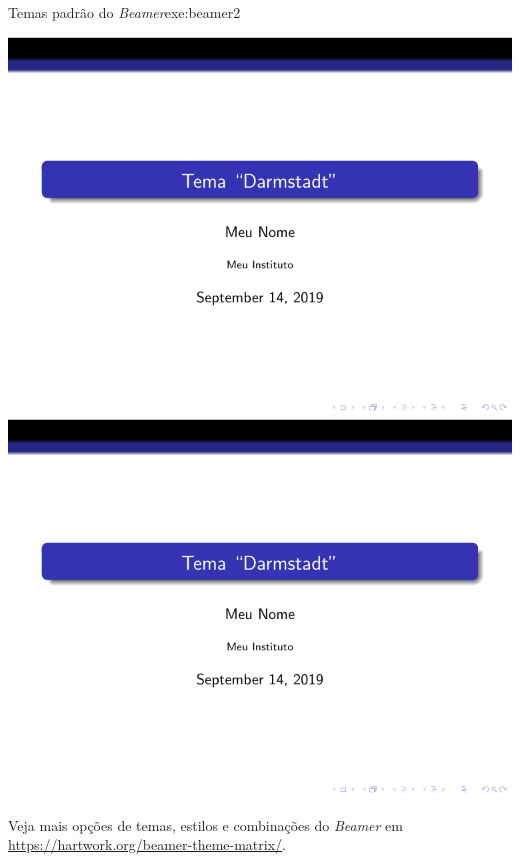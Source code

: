 \begin{texexptitled}{Temas padrão do \textit{Beamer}}{exe:beamer2}
\begin{tcbitemize}[raster columns=3,bicolor,
raster equal height,boxrule=0.1mm,
colframe=MaterialGreen900,colback=MaterialGrey50,
pdf comment]
\tcbitem[squeezed title={CambridgeUS}]\centering \includegraphics[scale=0.28,page=25]{./docs/figs/beamer.pdf}
\tcbitem[squeezed title={Copenhagen}] \centering \includegraphics[scale=0.28,page=26]{./docs/figs/beamer.pdf}

\end{tcbitemize}

\end{texexptitled}


\begin{marker}
Veja mais opções de temas, estilos e combinações do \textit{Beamer} em \url{https://hartwork.org/beamer-theme-matrix/}.
\end{marker}

